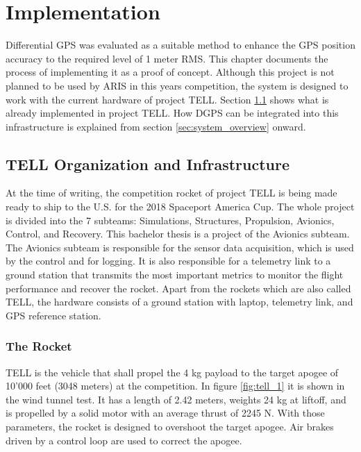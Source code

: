 \chapter{Implementation}

Differential GPS was evaluated as a suitable method to enhance the GPS position accuracy to the required level of 1 meter RMS.
This chapter documents the process of implementing it as a proof of concept.
Although this project is not planned to be used by ARIS in this years competition, the system is designed to work with the current hardware of project TELL.
Section \ref{sec:tell_infrastructure} shows what is already implemented in project TELL.
How DGPS can be integrated into this infrastructure is explained from section \ref{sec:system_overview} onward.


\section{TELL Organization and Infrastructure}\label{sec:tell_infrastructure}

At the time of writing, the competition rocket of project TELL is being made ready to ship to the U.S. for the 2018 Spaceport America Cup.
The whole project is divided into the 7 subteams: Simulations, Structures, Propulsion, Avionics, Control, and Recovery.
This bachelor thesis is a project of the Avionics subteam.
The Avionics subteam is responsible for the sensor data acquisition, which is used by the control and for logging.
It is also responsible for a telemetry link to a ground station that transmits the most important metrics to monitor the flight performance and recover the rocket.
Apart from the rockets which are also called TELL, the hardware consists of a ground station with laptop, telemetry link, and GPS reference station.

\subsection{The Rocket}

TELL is the vehicle that shall propel the 4 kg payload to the target apogee of 10'000 feet (3048 meters) at the competition.
In figure \ref{fig:tell_1} it is shown in the wind tunnel test.
It has a length of 2.42 meters, weights 24 kg at liftoff, and is propelled by a solid motor with an average thrust of 2245 N.
With those parameters, the rocket is designed to overshoot the target apogee.
Air brakes driven by a control loop are used to correct the apogee.

